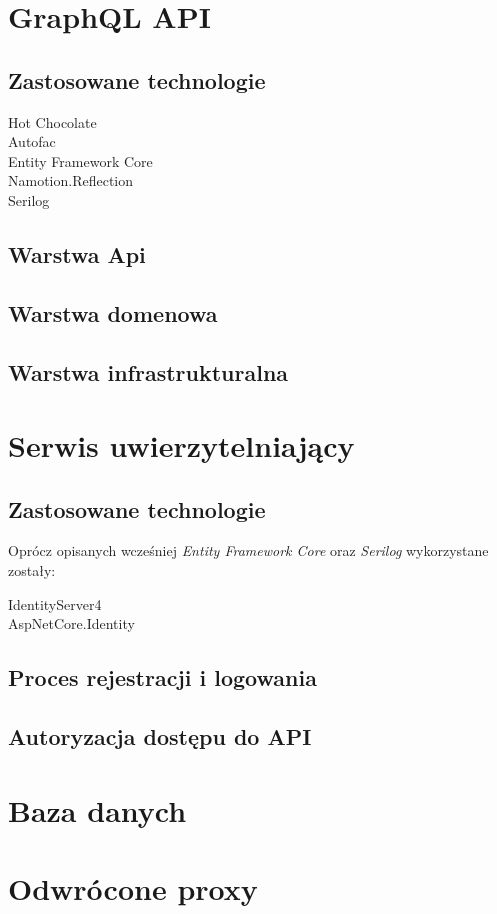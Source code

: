 \section{GraphQL API}
	\subsection{Zastosowane technologie}
		\begin{description}
			\item[Hot Chocolate] 
			\item[Autofac] 
			\item[Entity Framework Core] 
			\item[Namotion.Reflection] 
			\item[Serilog] 
		\end{description}

	\subsection{Warstwa Api}

	\subsection{Warstwa domenowa}

	\subsection{Warstwa infrastrukturalna}
	
\section{Serwis uwierzytelniający}
	\subsection{Zastosowane technologie}
		Oprócz opisanych wcześniej \emph{Entity Framework Core} oraz \emph{Serilog} wykorzystane zostały:
		\begin{description}
			\item[IdentityServer4] 
			\item[AspNetCore.Identity] 
		\end{description}

	\subsection{Proces rejestracji i logowania}

	\subsection{Autoryzacja dostępu do API}

\section{Baza danych}

\section{Odwrócone proxy}